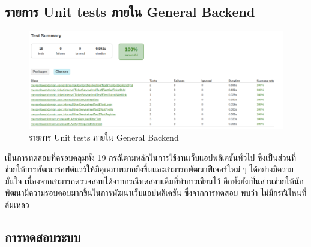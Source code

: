 \documentclass[12pt,oneside,openright,a4paper]{cpe-thai-project}
\begin{document}
\begin{itemize}
      \subsection{รายการ Unit tests ภายใน General Backend} 
        \begin{figure}[!ht]\centering
          \includegraphics[width=\textwidth]{./img/unit_test.png}
          \caption{รายการ Unit tests ภายใน General Backend}\label{fig:unit_test}
        \end{figure}
        \hspace{1cm}เป็นการทดสอบที่ครอบคลุมทั้ง 19 กรณีตามหลักในการใช้งานเว็บแอปพลิเคชันทั้วไป 
        ซึ่งเป็นส่วนที่ช่วยให้การพัฒนาซอฟต์แวร์ให้มีคุณภาพมากยิ่งขึ้นและสามารถพัฒนาฟีเจอร์ใหม่ ๆ ได้อย่างมีความมั่นใจ
        เนื่องจากสามารถตรวจสอบได้จากกรณีทดสอบเดิมที่ทำการเขียนไว้ 
        อีกทั้งยังเป็นส่วนช่วยให้นักพัฒนามีความรอบคอบมากขึ้นในการพัฒนาเว็บแอปพลิเคชัน
        ซึ่งจากการทดสอบ พบว่า ไม่มีกรณีไหนที่ล้มเหลว
      
      \subsection{การทดสอบระบบ}

\end{itemize}
\end{document}
